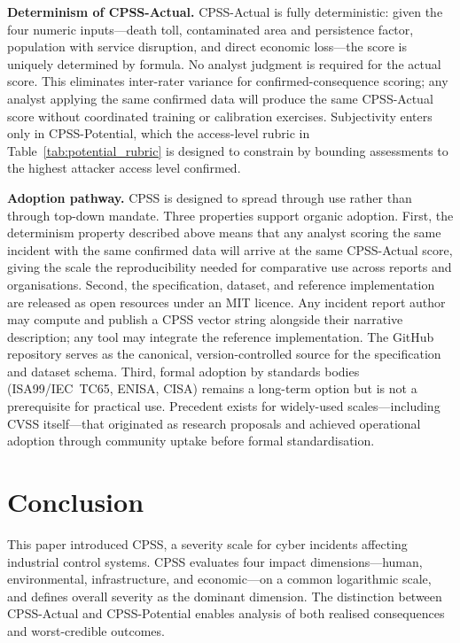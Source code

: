 \documentclass[11pt]{article}
\begin{document}
\textbf{Determinism of CPSS-Actual.}
CPSS-Actual is fully deterministic: given the four numeric inputs---death toll,
contaminated area and persistence factor, population with service disruption,
and direct economic loss---the score is uniquely determined by formula.
No analyst judgment is required for the actual score.
This eliminates inter-rater variance for confirmed-consequence scoring;
any analyst applying the same confirmed data will produce the same CPSS-Actual
score without coordinated training or calibration exercises.
Subjectivity enters only in CPSS-Potential, which the access-level rubric
in Table~\ref{tab:potential_rubric} is designed to constrain by bounding
assessments to the highest attacker access level confirmed.

\textbf{Adoption pathway.}
CPSS is designed to spread through use rather than through top-down mandate.
Three properties support organic adoption.
First, the determinism property described above means that any analyst scoring
the same incident with the same confirmed data will arrive at the same
CPSS-Actual score, giving the scale the reproducibility needed for
comparative use across reports and organisations.
Second, the specification, dataset, and reference implementation are
released as open resources under an MIT licence.
Any incident report author may compute and publish a CPSS vector string
alongside their narrative description; any tool may integrate the
reference implementation.
The GitHub repository serves as the canonical, version-controlled source
for the specification and dataset schema.
Third, formal adoption by standards bodies
(ISA99/IEC~TC65, ENISA, CISA) remains a long-term option but is not
a prerequisite for practical use.
Precedent exists for widely-used scales---including CVSS itself---that
originated as research proposals and achieved operational adoption through
community uptake before formal standardisation.

\section{Conclusion}

This paper introduced CPSS, a severity scale for cyber incidents
affecting industrial control systems.
CPSS evaluates four impact dimensions---human, environmental,
infrastructure, and economic---on a common logarithmic scale,
and defines overall severity as the dominant dimension.
The distinction between CPSS-Actual and CPSS-Potential enables
analysis of both realised consequences and worst-credible outcomes.
\end{document}
